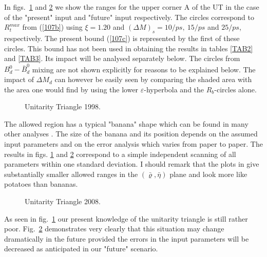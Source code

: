 In figs.~\ref{fig:utdata} and  \ref{fig:utdataf}  we show the ranges
 for the upper
corner A of the UT in the case of the "present" input and "future" input
respectively. The circles correspond to $R_t^{max}$ from 
(\ref{107b})
using $\xi=1.20$ and $(\Delta M)_s=10/ps,~15/ps$ and $25/ps$, respectively.
The present bound (\ref{107c}) is represented by the first
of these circles. 
This bound has not 
been used in
obtaining the results in tables \ref{TAB2} and \ref{TAB3}. 
Its impact will be analysed separately
below.
The circles from $B^0_d-\bar B^0_d$ mixing are not shown explicitly
for reasons to be explained below. The impact of $\Delta M_d$ can however
be easily seen by comparing the shaded area with the area one would find
by using the lower $\varepsilon$-hyperbola and the $R_b$-circles alone.
\begin{figure}[thb]
\vspace{0.10in}
\centerline{
\epsfysize=3.4in
}
\vspace{0.08in}
\caption[]{
Unitarity Triangle 1998.
\label{fig:utdata}}
\end{figure}
The allowed region has a typical "banana" shape which can be found
in many other analyses \cite{BLO,ciuchini:95,HNb,ALUT,FRENCH,PAGA}. 
The size of
the banana and its position depends on the assumed input
parameters and on the error analysis which varies from paper
to paper. The results in figs. \ref{fig:utdata} and  \ref{fig:utdataf}
correspond to a simple independent 
scanning of all parameters within one standard deviation.
I should remark that the plots in \cite{PAGA} give substantially smaller
allowed ranges in the $(\bar\varrho,\bar\eta)$ plane and look more
like potatoes than bananas.


\begin{figure}[thb]
\vspace{0.10in}
\centerline{
\epsfysize=3.6in
}
\vspace{0.08in}
\caption[]{
Unitarity Triangle 2008.
\label{fig:utdataf}}
\end{figure}

As seen in fig.~\ref{fig:utdata} our present knowledge of
the unitarity triangle is still rather poor. Fig.~\ref{fig:utdataf}
demonstrates very clearly that this situation may change dramatically
in the future provided the errors in the input parameters will be decreased
as anticipated in our "future" scenario. 

